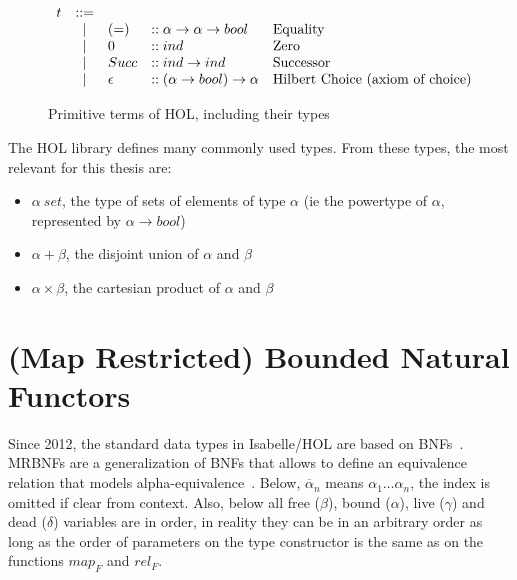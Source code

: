\begin{figure} %
\[
\begin{array}{rclll}
t  & \mathop{{:}{:}{=}} & & & \\
& \mathop{|} & (=) & :: \alpha \to \alpha \to bool & \text{Equality} \\
& \mathop{|} & 0 & :: ind & \text{Zero} \\
& \mathop{|} & Succ & :: ind \to ind & \text{Successor} \\
& \mathop{|} & \epsilon & :: (\alpha \to bool) \to \alpha & \text{Hilbert Choice (axiom of choice)} \\
\end{array}
\]
\caption{Primitive terms of \ac{HOL}, including their types}
\label{fig:hol_terms}
\end{figure}

The \ac{HOL} library defines many commonly used types. From these types, the most relevant for this thesis are:

\begin{itemize}
\item{$\alpha \: set$, the type of sets of elements of type $\alpha$ (ie the powertype of $\alpha$, represented by $\alpha \to bool$)}
\item{$\alpha + \beta$, the disjoint union of $\alpha$ and $\beta$}
\item{$\alpha \times \beta$, the cartesian product of $\alpha$ and $\beta$}
\end{itemize}

\section{(Map Restricted) Bounded Natural Functors}\label{sec:mrbnf_theory}

Since 2012, the standard data types in Isabelle/HOL are based on \acp{BNF}~\cite{isabelle_datatypes}. \acp{MRBNF} are a generalization of \acp{BNF} that allows to define an equivalence relation that models alpha-equivalence~\cite{mrbnfs}. Below, $\overline{\alpha}_n$ means $\alpha_1 \dots \alpha_n$, the index is omitted if clear from context. Also, below all free ($\beta$), bound ($\alpha$), live ($\gamma$) and dead ($\delta$) variables are in order, in reality they can be in an arbitrary order as long as the order of parameters on the type constructor is the same as on the functions $map_F$ and $rel_F$.

